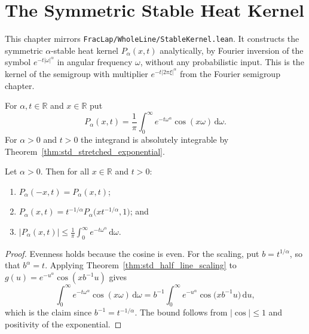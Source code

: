 \chapter{The Symmetric Stable Heat Kernel}

This chapter mirrors \texttt{FracLap/WholeLine/StableKernel.lean}. It constructs the symmetric $\alpha$-stable heat kernel $P_\alpha(x, t)$ analytically, by Fourier inversion of the symbol $e^{-t \lvert \omega \rvert^\alpha}$ in angular frequency $\omega$, without any probabilistic input. This is the kernel of the semigroup with multiplier $e^{-t \lvert 2\pi\xi \rvert^\alpha}$ from the Fourier semigroup chapter.

\begin{definition}\label{def:stable_kernel}
\leanok
For $\alpha, t \in \mathbb{R}$ and $x \in \mathbb{R}$ put
\[
  P_\alpha(x, t) = \frac{1}{\pi} \int_{0}^{\infty} e^{-t \omega^\alpha} \cos(x \omega)\, \mathrm{d}\omega.
\]
For $\alpha > 0$ and $t > 0$ the integrand is absolutely integrable by Theorem~\ref{thm:std_stretched_exponential}.
\end{definition}

\begin{lemma}\label{lem:stable_kernel_elementary}
\leanok
Let $\alpha > 0$. Then for all $x \in \mathbb{R}$ and $t > 0$:
\begin{enumerate}
  \item $P_\alpha(-x, t) = P_\alpha(x, t)$;
  \item $P_\alpha(x, t) = t^{-1/\alpha} P_\alpha\bigl(x t^{-1/\alpha}, 1\bigr)$; and
  \item $\lvert P_\alpha(x, t) \rvert \le \frac{1}{\pi} \int_0^\infty e^{-t \omega^\alpha}\, \mathrm{d}\omega$.
\end{enumerate}
\end{lemma}

\begin{proof}
\leanok
Evenness holds because the cosine is even. For the scaling, put $b = t^{1/\alpha}$, so that $b^\alpha = t$. Applying Theorem~\ref{thm:std_half_line_scaling} to $g(u) = e^{-u^\alpha} \cos(x b^{-1} u)$ gives
\[
  \int_0^\infty e^{-t \omega^\alpha} \cos(x \omega)\, \mathrm{d}\omega = b^{-1} \int_0^\infty e^{-u^\alpha} \cos\bigl(x b^{-1} u\bigr)\, \mathrm{d}u,
\]
which is the claim since $b^{-1} = t^{-1/\alpha}$. The bound follows from $\lvert \cos \rvert \le 1$ and positivity of the exponential.
\end{proof}
